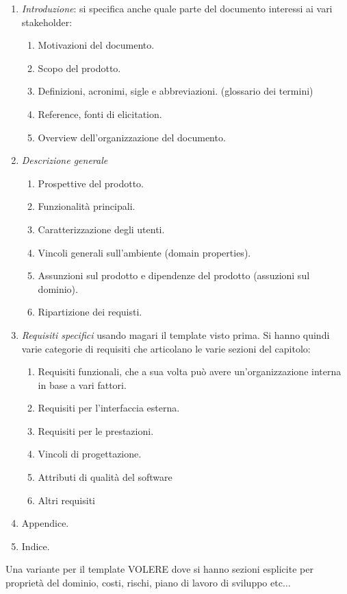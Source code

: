 \begin{enumerate}
      \item \textit{Introduzione}: si specifica anche quale parte del documento
            interessi ai vari stakeholder:
            \begin{enumerate}
                  \item Motivazioni del documento.
                  \item Scopo del prodotto.
                  \item Definizioni, acronimi, sigle e abbreviazioni. (glossario dei termini)
                  \item Reference, fonti di elicitation.
                  \item Overview dell'organizzazione del documento.
            \end{enumerate}
      \item \textit{Descrizione generale}
            \begin{enumerate}
                  \item Prospettive del prodotto.
                  \item Funzionalità principali.
                  \item Caratterizzazione degli utenti.
                  \item Vincoli generali sull'ambiente (domain properties).
                  \item Assunzioni sul prodotto e dipendenze del prodotto
                        (assuzioni sul dominio).
                  \item Ripartizione dei requisti.
            \end{enumerate}
      \item \textit{Requisiti specifici} usando magari il template visto prima.
            Si hanno quindi varie categorie di requisiti che articolano le varie
            sezioni del capitolo:
            \begin{enumerate}
                  \item Requisiti funzionali, che a sua volta può avere
                        un'organizzazione interna in base a vari fattori.
                  \item Requisiti per l'interfaccia esterna.
                  \item Requisiti per le prestazioni.
                  \item Vincoli di progettazione.
                  \item Attributi di qualità del software
                  \item Altri requisiti
            \end{enumerate}
      \item Appendice.
      \item Indice.
\end{enumerate}
Una variante per il template VOLERE dove si hanno sezioni esplicite per proprietà
del dominio, costi, rischi, piano di lavoro di sviluppo etc$\dots$

